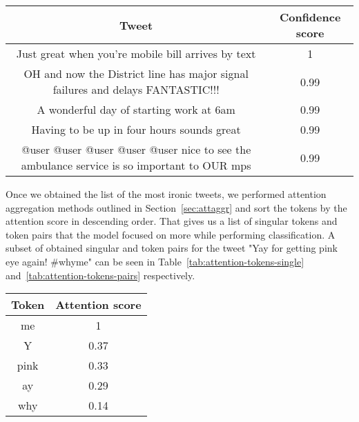 \documentclass[10pt, a4paper]{article}
\begin{document}
\begin{table*}
\caption{Most Ironic Tweets in the Test Set}
\label{tab:most-ironic-test}
\begin{center}
\begin{tabular}{c|c}
\toprule
Tweet & Confidence score\\
\midrule
Just great when you're mobile bill arrives by text                                          & 1 \\
OH and now the District line has major signal failures and delays FANTASTIC!!!              & 0.99 \\
A wonderful day of starting work at 6am                                                     & 0.99 \\
Having to be up in four hours sounds great                                                  & 0.99 \\
@user @user @user @user @user  nice to see the ambulance service is so important to OUR mps & 0.99 \\
\bottomrule
\end{tabular}
\end{center}
\end{table*}

Once we obtained the list of the most ironic tweets, we performed attention aggregation methods outlined in Section~\ref{sec:attaggr} and sort the tokens by the attention score in descending order.
That gives us a list of singular tokens and token pairs that the model focused on more while performing classification.
A subset of obtained singular and token pairs for the tweet "Yay for getting pink eye again!  \#whyme" can be seen in Table~\ref{tab:attention-tokens-single} and~\ref{tab:attention-tokens-pairs} respectively.

\begin{table*}
\caption{Single Tokens With Highest Attention for the Tweet "Yay for getting pink eye again!  \#whyme"}
\label{tab:attention-tokens-single}
\begin{center}
\begin{tabular}{c|c}
\toprule
Token & Attention score\\
\midrule
me    & 1 \\
Y     & 0.37 \\
pink  & 0.33 \\
ay    & 0.29 \\
why   & 0.14 \\
\bottomrule
\end{tabular}
\end{center}
\end{table*}
\end{document}
